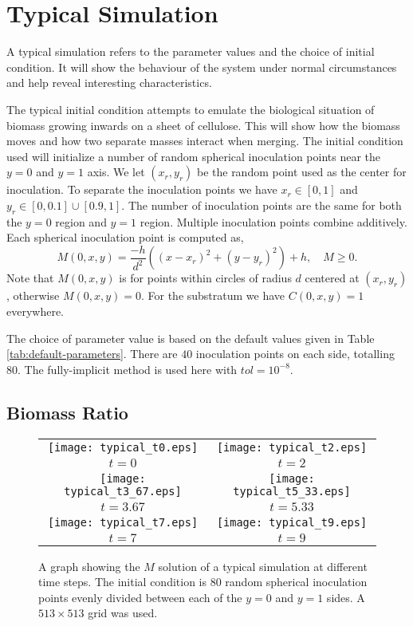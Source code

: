\section{Typical Simulation}

A typical simulation refers to the parameter values and the choice of initial condition.
It will show the behaviour of the system under normal circumstances and help reveal interesting characteristics.

The typical initial condition attempts to emulate the biological situation of biomass growing inwards on a sheet of cellulose.
This will show how the biomass moves and how two separate masses interact when merging.
The initial condition used will initialize a number of random spherical inoculation points near the $y=0$ and $y=1$ axis.
We let $(x_r, y_r)$ be the random point used as the center for inoculation.
To separate the inoculation points we have $x_r \in [0,1]$ and $y_r \in [0, 0.1] \cup [0.9, 1]$.
The number of inoculation points are the same for both the $y=0$ region and $y=1$ region.
Multiple inoculation points combine additively.
Each spherical inoculation point is computed as,
\begin{equation} \label{equ:typical_initial_cond}
  M(0,x,y) = \frac{-h}{d^2} \left( (x-x_r)^2 + (y - y_r)^2 \right) + h, \quad M \ge 0.
\end{equation}
Note that $M(0,x,y)$ is for points within circles of radius $d$ centered at $(x_r, y_r)$, otherwise $M(0,x,y) = 0$.
For the substratum we have $C(0,x,y) = 1$ everywhere.

The choice of parameter value is based on the default values given in Table \ref{tab:default-parameters}.
There are $40$ inoculation points on each side, totalling $80$.
The fully-implicit method is used here with $tol = 10^{-8}$.

\subsection{Biomass Ratio}

\begin{figure}[!htp]
  \centering
  \begin{tabular}{c c}
      \texttt{[image: typical\_t0.eps]} &
      \texttt{[image: typical\_t2.eps]} \\
      $t = 0$ & $t = 2$ \\
      \texttt{[image: typical\_t3\_67.eps]} &
      \texttt{[image: typical\_t5\_33.eps]} \\
      $t = 3.67$ & $t = 5.33$ \\
      \texttt{[image: typical\_t7.eps]} &
      \texttt{[image: typical\_t9.eps]} \\
      $t = 7$ & $t = 9$
   \end{tabular}
  \caption{A graph showing the $M$ solution of a typical simulation at different time steps.
    The initial condition is $80$ random spherical inoculation points evenly divided between each of the $y=0$ and $y=1$ sides.
    A $513 \times 513$ grid was used.  }
  \label{fig:typical_sim}
\end{figure}

